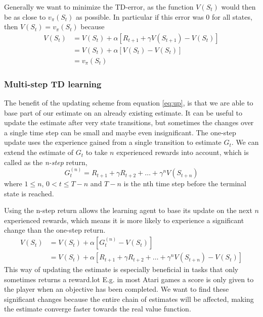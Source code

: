 \documentclass[11pt]{article}
\begin{document}
Generally we want to minimize the TD-error, as the function $V(S_t)$
would then be as close to $v_\pi(S_t)$ as possible.
In particular if this error was 0 for all states, then
$V(S_t) = v_\pi(S_t)$ because 
\begin{equation}
    \begin{aligned}
    V(S_t)  & = V(S_t) + \alpha  [R_{t+1} + \gamma  V(S_{t+1}) - V(S_t)]   \\
           & = V(S_t) + \alpha  [V(S_t) - V(S_t)]  \\
           & = v_\pi(S_t) 
    \end{aligned}
\end{equation}

\subsubsection{Multi-step TD learning}\label{sec:multi}

The benefit of the updating scheme from equation \ref{eq:up}, is that we are able to base
part of our estimate on an already existing estimate.
It can be useful to update the estimate after very state transitions, but sometimes
the changes over a single time step can be small and maybe even insignificant.
The one-step update uses the experience gained from a single transition to
estimate $G_t$.
We can extend the estimate of $G_t$ to take $n$ experienced rewards
into account, which is called as the \textit{n-step} return,
\begin{equation}
    G^{(n)}_t = R_{t+1} + \gamma R_{t+2} + \dots + \gamma^n V(S_{t+n})
\end{equation}
where $1 \leq n$, $0 < t \leq T - n$ and $T - n$ is the nth time step before the terminal state
is reached.

Using the n-step return allows the learning agent to base its update on the next $n$ experienced
rewards, which means it is more likely to experience a significant change than the one-step return.
\begin{equation}
    \begin{aligned}    
        V(S_t) & = V(S_t) + \alpha [G^{(n)}_t - V(S_t)]\\
        & = V(S_t) + \alpha [R_{t+1} + \gamma R_{t+2} + \dots + \gamma^n V(S_{t+n}) - V(S_t)]
    \end{aligned}
\end{equation}
This way of updating the estimate is especially beneficial in tasks that only sometimes returns a reward.lot 
E.g. in most Atari games a score is only given to the player when an objective has been completed.
We want to find these significant changes because the entire chain of estimates 
will be affected, making the estimate converge faster towards the real value function.
\end{document}
